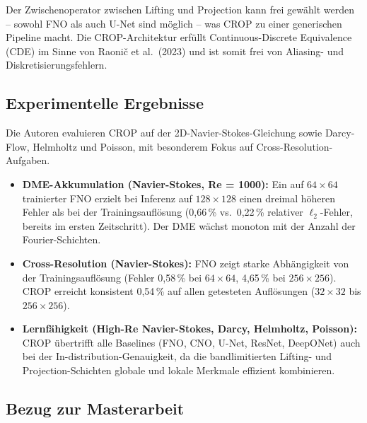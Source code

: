 \documentclass[a4paper,12pt]{article}
\begin{document}
Der Zwischenoperator zwischen Lifting und Projection kann frei gew\"ahlt
werden -- sowohl FNO als auch U-Net sind m\"oglich -- was CROP zu einer
generischen Pipeline macht. Die CROP-Architektur erf\"ullt
Continuous-Discrete Equivalence (CDE) im Sinne von Raoni\v{c} et al.\
(2023) und ist somit frei von Aliasing- und Diskretisierungsfehlern.

\subsection*{Experimentelle Ergebnisse}

Die Autoren evaluieren CROP auf der 2D-Navier-Stokes-Gleichung sowie
Darcy-Flow, Helmholtz und Poisson, mit besonderem Fokus auf
Cross-Resolution-Aufgaben.

\begin{itemize}
  \item \textbf{DME-Akkumulation (Navier-Stokes, Re = 1000):} Ein auf
    $64 \times 64$ trainierter FNO erzielt bei Inferenz auf
    $128 \times 128$ einen dreimal h\"oheren Fehler als bei der
    Trainingsaufl\"osung (0{,}66\,\% vs.\ 0{,}22\,\% relativer
    $\ell_2$-Fehler, bereits im ersten Zeitschritt). Der DME w\"achst
    monoton mit der Anzahl der Fourier-Schichten.

  \item \textbf{Cross-Resolution (Navier-Stokes):} FNO zeigt starke
    Abh\"angigkeit von der Trainingsaufl\"osung (Fehler 0{,}58\,\%
    bei $64\times64$, 4{,}65\,\% bei $256\times256$). CROP erreicht
    konsistent 0{,}54\,\% auf allen getesteten Aufl\"osungen
    ($32\times32$ bis $256\times256$).

  \item \textbf{Lernf\"ahigkeit (High-Re Navier-Stokes, Darcy, Helmholtz,
    Poisson):} CROP \"ubertrifft alle Baselines (FNO, CNO, U-Net, ResNet,
    DeepONet) auch bei der In-distribution-Genauigkeit, da die
    bandlimitierten Lifting- und Projection-Schichten globale und lokale
    Merkmale effizient kombinieren.
\end{itemize}

\subsection*{Bezug zur Masterarbeit}
\end{document}
